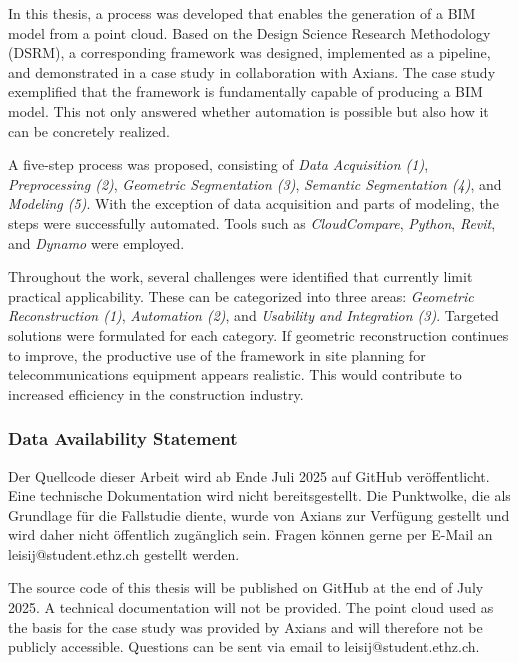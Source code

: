 \begin{English}
    In this thesis, a process was developed that enables the generation of a BIM model from a point cloud. Based on the Design Science Research Methodology (DSRM), a corresponding framework was designed, implemented as a pipeline, and demonstrated in a case study in collaboration with Axians. The case study exemplified that the framework is fundamentally capable of producing a BIM model. This not only answered whether automation is possible but also how it can be concretely realized.

    A five-step process was proposed, consisting of \textit{Data Acquisition (1)}, \textit{Preprocessing (2)}, \textit{Geometric Segmentation (3)}, \textit{Semantic Segmentation (4)}, and \textit{Modeling (5)}. With the exception of data acquisition and parts of modeling, the steps were successfully automated. Tools such as \textit{CloudCompare}, \textit{Python}, \textit{Revit}, and \textit{Dynamo} were employed.

    Throughout the work, several challenges were identified that currently limit practical applicability. These can be categorized into three areas: \textit{Geometric Reconstruction (1)}, \textit{Automation (2)}, and \textit{Usability and Integration (3)}. Targeted solutions were formulated for each category. If geometric reconstruction continues to improve, the productive use of the framework in site planning for telecommunications equipment appears realistic. This would contribute to increased efficiency in the construction industry.
\end{English}

\subsubsection{Data Availability Statement}
\begin{German}
    Der Quellcode dieser Arbeit wird ab Ende Juli 2025 auf GitHub veröffentlicht. Eine technische Dokumentation wird nicht bereitsgestellt. Die Punktwolke, die als Grundlage für die Fallstudie diente, wurde von Axians zur Verfügung gestellt und wird daher nicht öffentlich zugänglich sein. Fragen können gerne per E-Mail an leisij@student.ethz.ch gestellt werden. 
\end{German}

\begin{English}
    The source code of this thesis will be published on GitHub at the end of July 2025. A technical documentation will not be provided. The point cloud used as the basis for the case study was provided by Axians and will therefore not be publicly accessible. Questions can be sent via email to leisij@student.ethz.ch. 
\end{English}

